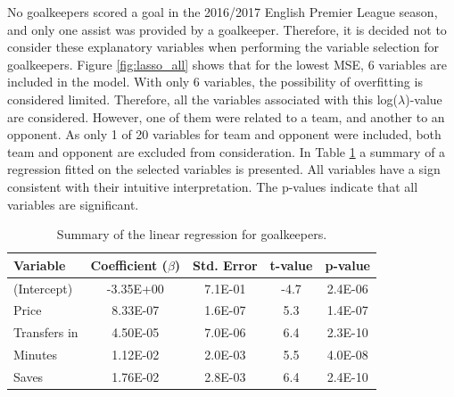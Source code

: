No goalkeepers scored a goal in the 2016/2017 English Premier League season, and only one assist was provided by a goalkeeper. Therefore, it is decided not to consider these explanatory variables when performing the variable selection for goalkeepers. Figure \ref{fig:lasso_all} shows that for the lowest MSE, 6 variables are included in the model. With only 6 variables, the possibility of overfitting is considered limited. Therefore, all the variables associated with this log($\lambda$)-value are considered. However, one of them were related to a team, and another to an opponent. As only 1 of 20 variables for team and opponent were included, both team and opponent are excluded from consideration. In Table \ref{tab:coef_GLK} a summary of a regression fitted on the selected variables is presented. All variables have a sign consistent with their intuitive interpretation. The p-values indicate that all variables are significant. 

\newpar



\begin{table}[!htb]
\centering
\begin{tabular}{|l|c|c|c|c|}
\hline
Variable     & Coefficient ($\beta$) & Std. Error & t-value & p-value \\ \hline
(Intercept) \Tstrut  & -3.35E+00    & 7.1E-01    & -4.7    & 2.4E-06               \\
Price         & 8.33E-07 & 1.6E-07    & 5.3     & 1.4E-07               \\
Transfers in & 4.50E-05 & 7.0E-06    & 6.4     & 2.3E-10               \\
Minutes      & 1.12E-02 & 2.0E-03    & 5.5     & 4.0E-08               \\
Saves       \Bstrut  & 1.76E-02 & 2.8E-03    & 6.4     & 2.4E-10                \\
\hline
\end{tabular}
\caption{Summary of the linear regression for goalkeepers.}
\label{tab:coef_GLK}
\end{table}

